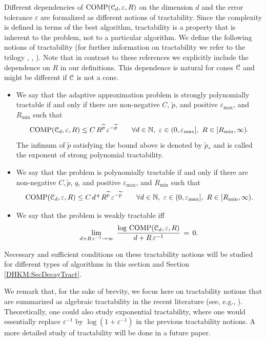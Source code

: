 \documentclass[USenglish]{article}
\theoremstyle{dgthm}
\theoremstyle{dgthm}
\theoremstyle{dgthm}
\theoremstyle{dgthm}
\theoremstyle{dgdef}
\theoremstyle{definition}
\DeclareMathOperator{\DHKMCOMP}{COMP}
\begin{document}
Different dependencies of $\DHKMCOMP(\calC_d, \varepsilon,R)$ on the dimension $d$ and the error tolerance $\varepsilon$ are formalized as different notions of tractability. Since 
the complexity is defined in terms of the best algorithm, tractability is a property that is inherent to the problem, not to a particular algorithm. 
We define the following notions of tractability (for further information on tractability we refer to the trilogy 
\cite{NovWoz08a}, \cite{NovWoz10a}, \cite{NovWoz12a}). Note that in contrast to 
these references we explicitly include the dependence on $R$ in our definitions. This 
dependence is natural for cones ${\mathcal{C}}$ and might be different if ${\mathcal{C}}$ is not a cone. 

\begin{itemize}   
\item We say that the adaptive approximation problem is strongly polynomially tractable
if and only if there are non-negative $C$, $\widetilde{p}$, and positive $\varepsilon_{\max}$, and $R_{\min}$ such that   
$$   
\DHKMCOMP(\calC_d, \varepsilon,R)\le C\,R^{\widetilde{p}}\,\varepsilon^{-\widetilde{p}} \qquad \forall d\in\NN,\ \varepsilon \in (0, \varepsilon_{\max}], \ R \in [R_{\min}, \infty).
$$   
The infimum of $\widetilde{p}$ satisfying the bound above is denoted by $\widetilde{p}_*$  and is called the exponent of strong polynomial tractability.    
\newline \qquad   

\item    
We say that the problem is polynomially tractable
if and only if there are non-negative $C,\widetilde{p}$, $q$, and positive $\varepsilon_{\max}$, and $R_{\min}$ such that   
$$   
\DHKMCOMP(\calC_d, \varepsilon,R)\le C\,d^{\,q}\,R^{\widetilde{p}}\,   
\varepsilon^{-{\widetilde{p}}}\qquad \forall d\in\NN,\ \varepsilon \in (0, \varepsilon_{\max}], \ R \in [R_{\min}, \infty).  
$$   
\vskip 0.5pc     

   
\item   
We say that the problem is weakly tractable iff    
$$   
\lim_{d+R\,\varepsilon^{-1}\to\infty}\   
\frac{\log\, \DHKMCOMP(\calC_d, \varepsilon,R)}   
{d+R\,\varepsilon^{-1}}\,=\,0.   
$$    
\end{itemize}   
Necessary and sufficient conditions on these tractability notions will be studied 
for different types of algorithms in this section and Section \ref{DHKM:SecDecayTract}. 

We remark that, for the sake of brevity, we focus here on tractability notions that are summarized as 
algebraic tractability in the recent literature 
(see, e.g., \cite{KriWoz19}). Theoretically, one could also study exponential tractability, where 
one would essentially replace $\varepsilon^{-1}$ 
by $\log (1 + \varepsilon^{-1})$ in the previous tractability notions. A more detailed study of 
tractability will be done in a future paper.
\end{document}
